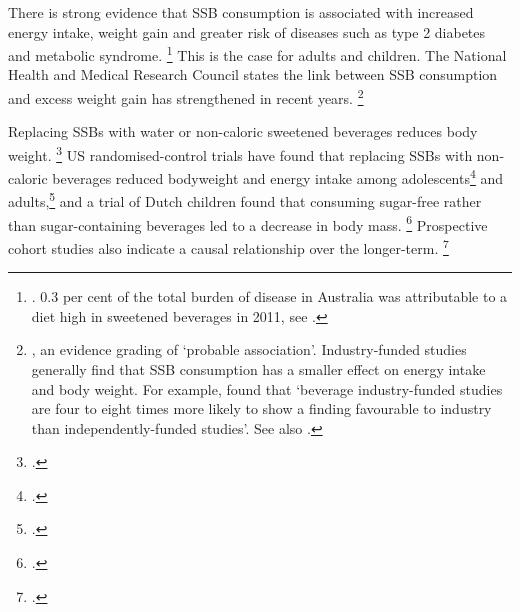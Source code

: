 \documentclass[embargoed]{grattan}
\begin{document}
There is strong evidence that SSB consumption is associated with increased energy intake, weight gain and greater risk of diseases such as type 2 diabetes and metabolic syndrome.%
\footnote{\textcites{Johnson2009Dietarysugarsintake}{Woodward-Lopez2010whatextenthave}{Ludwig2001Relationconsumptionsugar}{Berkey2004Sugaraddedbeveragesadolescent}{Gill2006weightevidencesuggests}{TeMorenga2013Dietarysugarsbody}{Tam2006Softdrinkconsumption}{Basu2013Relationshipsoftdrink}{Dhingra2007Softdrinkconsumption}{Vartanian2007Effectssoftdrink}{Imamura2015Consumptionsugarsweetened}{Pan2013Changeswaterbeverage}{Malik2006Intakesugarsweetened}{Malik2010Sugarsweetenedbeverages}{Malik2010riskmetaanalysis}{Organization2016Reportcommissionending}{Organisation2015Sugarsintakeadults}{Agriculture2010DietaryGuidelinesAmericans}. 0.3 per cent of the total burden of disease in Australia was attributable to a diet high in sweetened beverages in 2011, see \textcite{Health2016AustralianBurdenDisease}.} This is the case for adults and children.
The National Health and Medical Research Council states the link between SSB consumption and excess weight gain has strengthened in recent years.%
\footnote{\textcite[][67]{Health2013AustralianDietaryGuidelines}, an evidence grading of `probable association'.
Industry-funded studies generally find that SSB consumption has a smaller effect on energy intake and body weight.
For example, \textcite{Vartanian2007Effectssoftdrink} found that `beverage industry-funded studies are four to eight times more likely to show a finding favourable to industry than independently-funded studies'.
See also \textcites{Bes-Rastrollo2013Financialconflictsinterest}{Lesser2007Relationshipfundingsource}.}

Replacing SSBs with water or non-caloric sweetened beverages reduces body weight.%
\footcite{Malik2006Intakesugarsweetened} US randomised-control trials have found that replacing SSBs with non-caloric beverages reduced bodyweight and energy intake among adolescents\footcite{Ebbeling2002Childhoodobesitypublic} and adults,\footcite{Chen2009Reductionconsumptionsugar} and a trial of Dutch children found that consuming sugar-free rather than sugar-containing beverages led to a decrease in body mass.%
\footcites{Ruyter2012trialsugarfree}{Malik2006Intakesugarsweetened} Prospective cohort studies also indicate a causal relationship over the longer-term.%
\footcites{Hu2013Resolvedthereis}{Malik2006Intakesugarsweetened}{TeMorenga2013Dietarysugarsbody}
\end{document}
